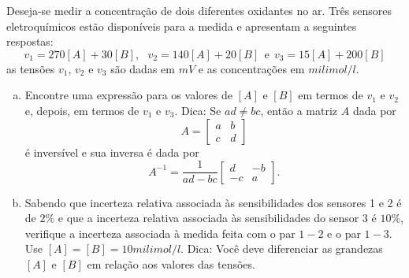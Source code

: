 \begin{exeresol} Deseja-se medir a concentração de dois diferentes oxidantes no ar. Três sensores eletroquímicos estão disponíveis para a medida e apresentam a seguintes respostas:
\begin{equation} v_1= 270 [A] +  30 [B],~~~ v_2= 140 [A] +  20 [B] ~~ \text{e}~~ v_3= 15 [A] +  200 [B] \end{equation}
as tensões $v_1$, $v_2$ e $v_3$ são dadas em $mV$ e as concentrações em $milimol/l$.
\begin{enumerate}[a)]
\item Encontre uma expressão para os valores de $[A]$ e $[B]$ em termos de $v_1$ e $v_2$ e, depois, em termos de $v_1$ e $v_3$. Dica:
Se $ad\neq bc$, então a matriz $A$ dada por
\begin{equation} A=\begin{bmatrix}a&b\\c&d\end{bmatrix} \end{equation}
é inversível e sua inversa é dada por
\begin{equation} A^{-1}= \frac{1}{ad-bc} \left[\begin{array}{cc}d&-b\\-c&a\end{array}\right]. \end{equation}

\item Sabendo que incerteza relativa associada às sensibilidades dos sensores 1 e 2 é de $2\%$ e que a incerteza relativa associada às sensibilidades do sensor 3 é $10\%$, verifique a incerteza associada à medida feita com o par $1-2$ e o par $1-3$. Use $[A]=[B]=10milimol/l$. Dica: Você deve diferenciar as grandezas $[A]$ e $[B]$ em relação aos valores das tensões.
\end{enumerate}
\end{exeresol}
